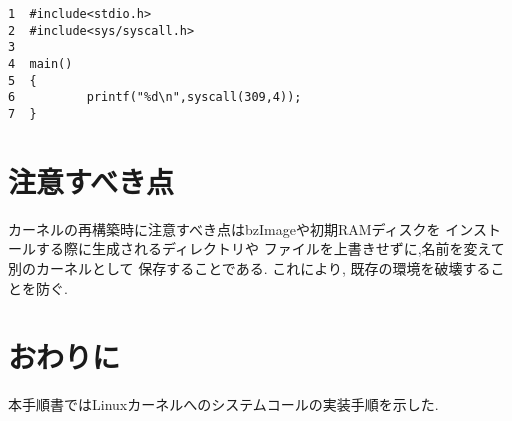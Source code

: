 \documentclass[12pt]{jsarticle}
\begin{document}
\begin{verbatim}
1  #include<stdio.h>
2  #include<sys/syscall.h>
3  
4  main()
5  {
6          printf("%d\n",syscall(309,4));
7  }
\end{verbatim}



\section{注意すべき点}
カーネルの再構築時に注意すべき点はbzImageや初期RAMディスクを
インストールする際に生成されるディレクトリや
ファイルを上書きせずに,名前を変えて別のカーネルとして
保存することである.
これにより,
既存の環境を破壊することを防ぐ.
\section{おわりに}
本手順書ではLinuxカーネルへのシステムコールの実装手順を示した.
\end{document}
